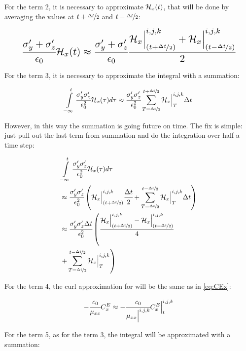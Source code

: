 For the term 2, it is necessary to approximate $\mathcal{H}_x(t)$, that will be done by averaging the values at $t + \nicefrac{\Delta t}{2}$ and $t - \nicefrac{\Delta t}{2}$:

\begin{align}
    \resizebox{.9\hsize}{!}{$
    \cfrac{\sigma_y\Prime + \sigma_z\Prime}{\epsilon_0}\Hht_x(t)\approx
    \cfrac{\sigma_y\Prime + \sigma_z\Prime}{\epsilon_0}\cfrac{\Hht_x\Big|_{(t+\nicefrac{\dt}{2})}^{i,j,k}+\Hht_x\Big|^{i,j,k}_{(t-\nicefrac{\dt}{2})}}{2}
    $}
\end{align}

For the term 3, it is necessary to approximate the integral with a summation:

\begin{align}
    \int\limits_{-\infty}^t\cfrac{\sigma_y^{\prime}\sigma_z^{\prime}}{\epsilon_0^2}\mathcal{H}_x(\tau)d\tau \approx \cfrac{\sigma_y^{\prime}\sigma_z^{\prime}}{\epsilon_0^2} \sum_{T=\nicefrac{\Delta t}{2}}^{t + \nicefrac{\Delta t}{2}}\mathcal{H}_x\Big|^{i,j,k}_{T}\Delta t
\end{align}

However, in this way the summation is going future on time. The fix is simple: just pull out the last term from summation and do the integration over half a time step:

\begin{align}
    &\int\limits_{-\infty}^t\cfrac{\sigma_y^{\prime}\sigma_z^{\prime}}{\epsilon_0^2}\mathcal{H}_x(\tau)d\tau \nonumber \\ \nonumber
    &\approx \cfrac{\sigma_y^{\prime}\sigma_z^{\prime}}{\epsilon_0^2} \left( \mathcal{H}_x\Big|_{(t+\nicefrac{\Delta t}{2})}^{i,j,k} \cfrac{\Delta t}{2} + \sum\limits_{T=\nicefrac{\Delta t}{2}}^{t - \nicefrac{\Delta t}{2}}\mathcal{H}_x\Big|^{i,j,k}_{T}\Delta t \right) \\ \nonumber
    &\approx\cfrac{\sigma_y^{\prime}\sigma_z^{\prime}\Delta t}{\epsilon_0^2} \left( \cfrac{\mathcal{H}_x\Big|_{(t+\nicefrac{\Delta t}{2})}^{i,j,k}-\mathcal{H}_x\Big|^{i,j,k}_{(t-\nicefrac{\Delta t}{2})}}{4} \right. \\ & \left. + \sum\limits_{T=\nicefrac{\Delta t}{2}}^{t - \nicefrac{\Delta t}{2}}\mathcal{H}_x\Big|^{i,j,k}_{T} \right)
\end{align}


For the term 4, the curl approximation for will be the same as in \eqref{eq:CEx}:

\begin{align}
    -\cfrac{c_0}{\mu_{xx}}C_x^E \approx -\cfrac{c_0}{\mu_{xx}\Big|^{i,j,k}}C_x^E\Big|^{i,j,k}_{t}
\end{align}

For the term 5, as for the term 3, the integral will be approximated with a summation:

